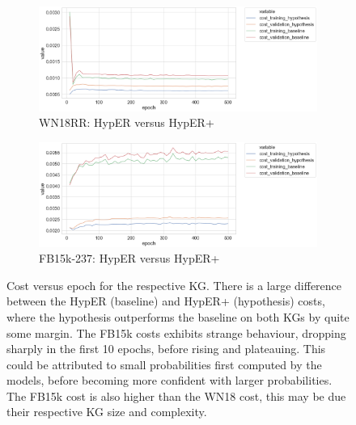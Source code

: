 \begin{figure}[H]
	\begin{subfigure}[b]{.5\linewidth}
   		\centering
    		\includegraphics[width=1.0\linewidth, height=0.6\linewidth]{WN18RR_Cost_Results}
		\captionsetup{justification=centering}
		\caption{WN18RR: HypER versus HypER+}
	\end{subfigure}
	\begin{subfigure}[b]{.5\linewidth}
   		\centering
		\includegraphics[width=1.0\linewidth, height=0.6\linewidth]{FB15k-237_Cost_Results}
		\captionsetup{justification=centering}
		\caption{FB15k-237: HypER versus HypER+}
	\end{subfigure}
	\captionsetup{justification=centering}
	\caption{Cost versus epoch for the respective KG. There is a large difference between the HypER (baseline) and HypER+ (hypothesis) costs, where the hypothesis outperforms the baseline on both KGs by quite some margin. The FB15k costs exhibits strange behaviour, dropping sharply in the first 10 epochs, before rising and plateauing. This could be attributed to small probabilities first computed by the models, before becoming more confident with larger probabilities. The FB15k cost is also higher than the WN18 cost, this may be due their respective KG size and complexity.}
\end{figure}

